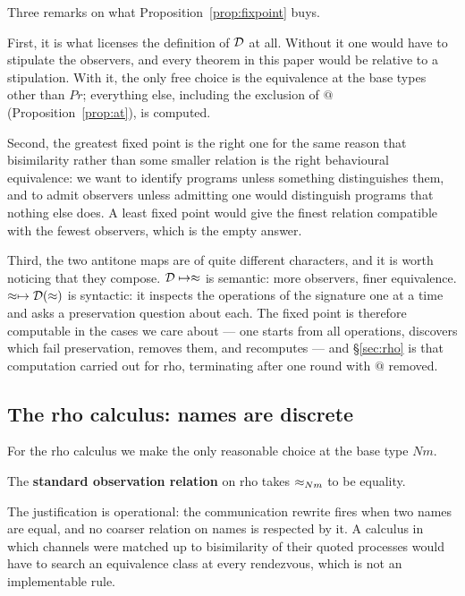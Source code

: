 \documentclass{article}
\begin{document}
Three remarks on what Proposition~\ref{prop:fixpoint} buys.

First, it is what licenses the definition of $\mathcal{D}$ at all. Without it one would have to stipulate the observers, and every theorem in this paper would be relative to a stipulation. With it, the only free choice is the equivalence at the base types other than $Pr$; everything else, including the exclusion of $@$ (Proposition~\ref{prop:at}), is computed.

Second, the greatest fixed point is the right one for the same reason that bisimilarity rather than some smaller relation is the right behavioural equivalence: we want to identify programs unless something distinguishes them, and to admit observers unless admitting one would distinguish programs that nothing else does. A least fixed point would give the finest relation compatible with the fewest observers, which is the empty answer.

Third, the two antitone maps are of quite different characters, and it is worth noticing that they compose. $\mathcal{D}\mapsto\approx$ is semantic: more observers, finer equivalence. $\approx\mapsto\mathcal{D}(\approx)$ is syntactic: it inspects the operations of the signature one at a time and asks a preservation question about each. The fixed point is therefore computable in the cases we care about --- one starts from all operations, discovers which fail preservation, removes them, and recomputes --- and \S\ref{sec:rho} is that computation carried out for rho, terminating after one round with $@$ removed.

\subsection{The rho calculus: names are discrete}

For the rho calculus we make the only reasonable choice at the base type $Nm$.

\begin{definition}
\label{def:rhoobs}
    The \textbf{standard observation relation} on rho takes $\approx_{Nm}$ to be equality.
\end{definition}

The justification is operational: the communication rewrite fires when two names are equal, and no coarser relation on names is respected by it. A calculus in which channels were matched up to bisimilarity of their quoted processes would have to search an equivalence class at every rendezvous, which is not an implementable rule.
\end{document}
